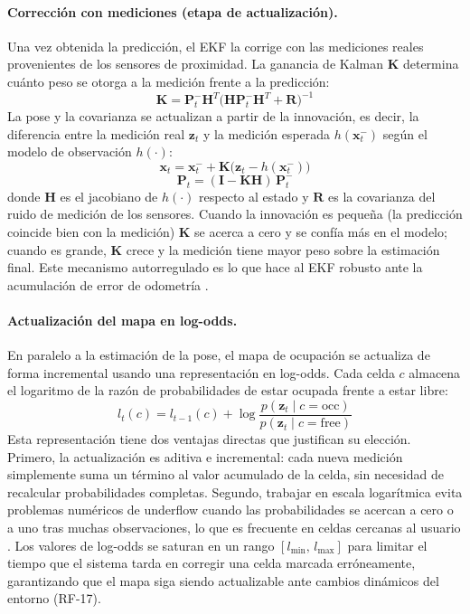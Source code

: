\paragraph{Corrección con mediciones (etapa de actualización).}
Una vez obtenida la predicción, el EKF la corrige con las mediciones reales
provenientes de los sensores de proximidad. La ganancia de Kalman $\mathbf{K}$
determina cuánto peso se otorga a la medición frente a la predicción:
\[
\mathbf{K} = \mathbf{P}_t^{-}\mathbf{H}^T
             \bigl(\mathbf{H}\mathbf{P}_t^{-}\mathbf{H}^T + \mathbf{R}\bigr)^{-1}
\]
La pose y la covarianza se actualizan a partir de la innovación, es decir, la
diferencia entre la medición real $\mathbf{z}_t$ y la medición esperada
$h(\mathbf{x}_t^{-})$ según el modelo de observación $h(\cdot)$:
\[
\mathbf{x}_t = \mathbf{x}_t^{-} + \mathbf{K}\bigl(\mathbf{z}_t - h(\mathbf{x}_t^{-})\bigr)
\]
\[
\mathbf{P}_t = (\mathbf{I} - \mathbf{K}\mathbf{H})\,\mathbf{P}_t^{-}
\]
donde $\mathbf{H}$ es el jacobiano de $h(\cdot)$ respecto al estado y $\mathbf{R}$ es
la covarianza del ruido de medición de los sensores. Cuando la innovación es pequeña
(la predicción coincide bien con la medición) $\mathbf{K}$ se acerca a cero y se
confía más en el modelo; cuando es grande, $\mathbf{K}$ crece y la medición tiene
mayor peso sobre la estimación final. Este mecanismo autorregulado es lo que hace al
EKF robusto ante la acumulación de error de odometría \cite{thrun2005probabilistic}.

\paragraph{Actualización del mapa en log-odds.}
En paralelo a la estimación de la pose, el mapa de ocupación se actualiza de forma
incremental usando una representación en log-odds. Cada celda $c$ almacena el
logaritmo de la razón de probabilidades de estar ocupada frente a estar libre:
\[
l_t(c) = l_{t-1}(c) +
\log\frac{p(\mathbf{z}_t \mid c = \text{occ})}{p(\mathbf{z}_t \mid c = \text{free})}
\]
Esta representación tiene dos ventajas directas que justifican su elección. Primero,
la actualización es aditiva e incremental: cada nueva medición simplemente suma un
término al valor acumulado de la celda, sin necesidad de recalcular probabilidades
completas. Segundo, trabajar en escala logarítmica evita problemas numéricos de
underflow cuando las probabilidades se acercan a cero o a uno tras muchas
observaciones, lo que es frecuente en celdas cercanas al usuario
\cite{thrun2005probabilistic}. Los valores de log-odds se saturan en un rango
$[l_{\min},\, l_{\max}]$ para limitar el tiempo que el sistema tarda en corregir
una celda marcada erróneamente, garantizando que el mapa siga siendo actualizable
ante cambios dinámicos del entorno (RF-17).


